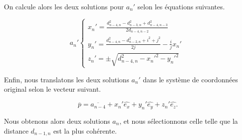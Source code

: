 \vspace{0.4cm}
\par On calcule alors les deux solutions pour $a_n'$ selon les équations suivantes.

\vspace{0.4cm}

\[
a_{n}'\left \{
   	\begin{array}{l}
      x_{n}'= \frac{d_{n-4,n}^2 - d_{n-3,n}^2 + d_{n-4,n-3}^2}{2d_{n-4,n-2}}\\
      y_{n}'= \frac{d_{n-4,n}^2 - d_{n-2,n}^2 + i^2 + j^2}{2j}-\frac{i}{j}x_{n}'\\
	  z_{n}'= \pm\sqrt{d_{n-4,n}^2 - x_{n}'^2 - y_{n}'^2}
   	\end{array}
   	\right .
   	\:
\]

\vspace{0.4cm}

\par Enfin, nous translatons les deux solutions $a_n'$ dans le système de coordonnées original selon le vecteur suivant.

\[
\overline{p} = \overline{a_{n-4}} + x_{n}'\hat{e_x} + y_{n}'\hat{e_y} + z_{n}'\hat{e_z}.
\]

\vspace{0.4cm}

Nous obtenons alors deux solutions $a_n$, et nous sélectionnons celle telle que la distance $d_{n-1,n}$ est la plus cohérente.


